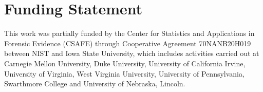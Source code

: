 \hypertarget{funding-statement}{%
\section{Funding Statement}\label{funding-statement}}

This work was partially funded by the Center for Statistics and
Applications in Forensic Evidence (CSAFE) through Cooperative Agreement
70NANB20H019 between NIST and Iowa State University, which includes
activities carried out at Carnegie Mellon University, Duke University,
University of California Irvine, University of Virginia, West Virginia
University, University of Pennsylvania, Swarthmore College and
University of Nebraska, Lincoln.




\address{%
Joseph Zemmels\\
Iowa State University\\%
2438 Osborn Drive\\ Ames, IA 50011\\
%
%
%
\\\href{mailto:jzemmels@iastate.edu}{\nolinkurl{jzemmels@iastate.edu}}
}

\address{%
Susan VanderPlas\\
Department of Statistics\\%
University of Nebraska - Lincoln\\ 340 Hardin Hall North Wing\\ Lincoln,
NE 68583\\
%
%
%
\\\href{mailto:susan.vanderplas@unl.edu}{\nolinkurl{susan.vanderplas@unl.edu}}
}

\address{%
Heike Hofmann\\
Iowa State University\\%
Center for Statistics and Applications in Forensic Evidence\\ Department
of Statistics\\ 2438 Osborn Drive\\ Ames, IA 50011\\
%
%
%
\\\href{mailto:hofmann@iastate.edu}{\nolinkurl{hofmann@iastate.edu}}
}
